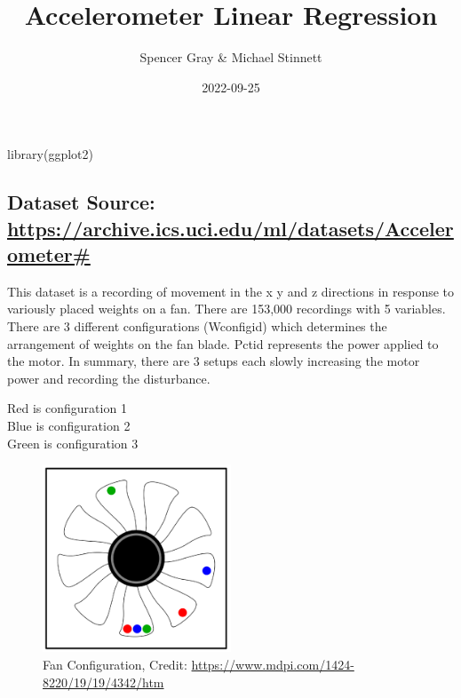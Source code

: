 \documentclass[
]{article}
\title{Accelerometer Linear Regression}
\author{Spencer Gray \& Michael Stinnett}
\date{2022-09-25}
\newenvironment{Shaded}{\begin{snugshade}}{\end{snugshade}}
\newcommand{\FunctionTok}[1]{\textcolor[rgb]{0.00,0.00,0.00}{#1}}
\newcommand{\NormalTok}[1]{#1}
\begin{document}
\maketitle

\begin{Shaded}
\begin{Highlighting}[]
\FunctionTok{library}\NormalTok{(ggplot2)}
\end{Highlighting}
\end{Shaded}

\hypertarget{dataset-source-httpsarchive.ics.uci.edumldatasetsaccelerometer}{%
\subsection{\texorpdfstring{Dataset Source:
\url{https://archive.ics.uci.edu/ml/datasets/Accelerometer\#}}{Dataset Source: https://archive.ics.uci.edu/ml/datasets/Accelerometer\#}}\label{dataset-source-httpsarchive.ics.uci.edumldatasetsaccelerometer}}

This dataset is a recording of movement in the x y and z directions in
response to variously placed weights on a fan. There are 153,000
recordings with 5 variables. There are 3 different configurations
(Wconfigid) which determines the arrangement of weights on the fan
blade. Pctid represents the power applied to the motor. In summary,
there are 3 setups each slowly increasing the motor power and recording
the disturbance.

Red is configuration 1\\
Blue is configuration 2\\
Green is configuration 3

\begin{figure}
\centering
\includegraphics[width=0.5\textwidth,height=\textheight]{fan.webp}
\caption{Fan Configuration, Credit:
\url{https://www.mdpi.com/1424-8220/19/19/4342/htm}}
\end{figure}
\end{document}
